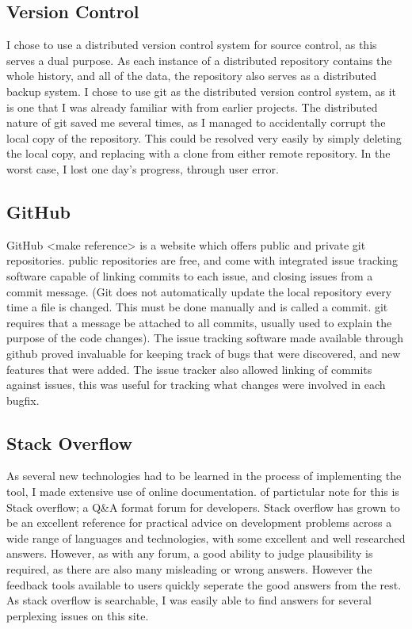 \subsection{Version Control}
I chose to use a distributed version control system for source control, as this serves a dual purpose. As each instance of a distributed repository contains the whole history, and all of the data, the repository also serves as a distributed backup system. 
I chose to use git as the distributed version control system, as it is one that I was already familiar with from earlier projects. The distributed nature of git saved me several times, as I managed to accidentally corrupt the local copy of the repository. This could be resolved very easily by simply deleting the local copy, and replacing with a clone from either remote repository. In the worst case, I lost one day's progress, through user error.

\subsection{GitHub}
GitHub <make reference> is a website which offers public and private git repositories. public repositories are free, and come with integrated issue tracking software capable of linking commits to each issue, and closing issues from a commit message. (Git does not automatically update the local repository every time a file is changed. This must be done manually and is called a commit. git requires that a message be attached to all commits, usually used to explain the purpose of the code changes). The issue tracking software made available through github proved invaluable for keeping track of bugs that were discovered, and new features that were added. The issue tracker also allowed linking of commits against issues, this was useful for tracking what changes were involved in each bugfix.

\subsection{Stack Overflow}
As several new technologies had to be learned in the process of implementing the tool, I made extensive use of online documentation. of partictular note for this is Stack overflow; a  Q\&A format forum for developers. Stack overflow has grown to be an excellent reference for practical advice on development problems across a wide range of languages and technologies, with some excellent and well researched answers. However, as with any forum, a good ability to judge plausibility is required, as there are also many misleading or wrong answers. However the feedback tools available to users quickly seperate the good answers from the rest. As stack overflow is searchable, I was easily able to find answers for several perplexing issues on this site. 